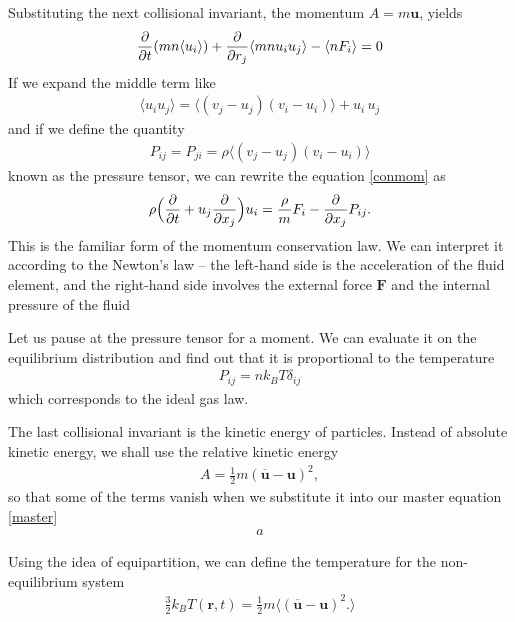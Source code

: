 Substituting the next collisional invariant, the momentum $A=m\bm{u}$, yields
\begin{align} \label{conmom}
\frac{\partial}{\partial t} (mn\langle u_i \rangle) + \frac{\partial}{\partial r_j}\langle mn u_i u_j \rangle - \langle n F_i \rangle = 0
\end{align}
If we expand the middle term like
\begin{align*}
\langle u_i u_j \rangle = \langle (v_j - u_j) (v_i - u_i) \rangle + u_i\, u_j
\end{align*}
and if we define the quantity
\begin{align*}
P_{ij} = P_{ji} = \rho \langle (v_j - u_j) (v_i - u_i) \rangle
\end{align*}
known as the pressure tensor,
we can rewrite the equation \ref{conmom} as
\begin{align*}
\rho \Big(\frac{\partial}{\partial t} + u_j \frac{\partial}{\partial x_j} \Big) u_i = \frac{\rho}{m} F_i - \frac{\partial}{\partial x_j}P_{ij}.
\end{align*}
This is the familiar form of the momentum conservation law. We can interpret it according to the Newton's law -- the left-hand side is the acceleration of the fluid element, and the right-hand side involves the external force $\bm{F}$ and the internal pressure of the fluid

Let us pause at the pressure tensor for a moment. We can evaluate it on the equilibrium distribution and find out that it is proportional to the temperature
\begin{align*}
P_{ij} = n k_B T \delta_{ij}
\end{align*} 
which corresponds to the ideal gas law.

\bigskip

The last collisional invariant is the kinetic energy of particles.
Instead of absolute kinetic energy, we shall use the relative kinetic energy
\begin{align*}
A  = \frac{1}{2} m (\overline{\bm{u}} - \bm{u})^2,
\end{align*}
so that some of the terms vanish when we substitute it into our master equation \ref{master}
\begin{align} \label{cone}
a
\end{align}

Using the idea of equipartition, we can define the temperature for the non-equilibrium system
\begin{align*}
\frac{3}{2}k_B T(\bm{r},t) = \frac{1}{2} m \langle (\overline{\bm{u}} - \bm{u})^2. \rangle
\end{align*}

